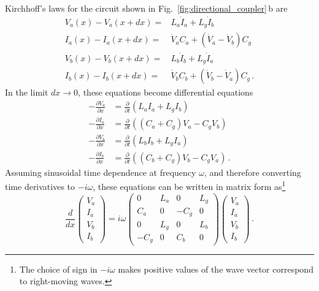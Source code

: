  \label{appendix:coupled_lines}

Kirchhoff's laws for the circuit shown in Fig.~\ref{fig:directional_coupler}\,b are
\begin{align*}
  V_a(x) - V_a(x + dx) =& L_a \dot I_a + L_g \dot I_b \\
  I_a(x) - I_a(x + dx) =& \dot V_a C_a + \left( \dot V_a - \dot V_b \right) C_g \\
  V_b(x) - V_b(x + dx) =& L_b \dot I_b + L_g \dot I_a \\
  I_b(x) - I_b(x + dx) =& \dot V_b C_b + \left( \dot V_b - \dot V_a \right) C_g
  \, .
\end{align*}
In the limit $dx \rightarrow 0$, these equations become differential equations
\begin{align}
  - \frac{\partial V_a}{\partial x} &= \frac{\partial}{\partial t}
    \left( L_a I_a + L_g I_b \right) \nonumber \\
  - \frac{\partial I_a}{\partial x} &= \frac{\partial}{\partial t}
    \left( (C_a + C_g)V_a - C_g V_b \right) \nonumber \\
  - \frac{\partial V_b}{\partial x} &= \frac{\partial}{\partial t}
    \left( L_b I_b + L_g I_a \right) \nonumber \\
  - \frac{\partial I_b}{\partial x} &= \frac{\partial}{\partial t}
    \left( (C_b + C_g)V_b - C_g V_a \right)
  \, .
\end{align}
Assuming sinusoidal time dependence at frequency $\omega$, and therefore converting time derivatives to $-i \omega$, these equations can be written in matrix form as\footnote{The choice of sign in $-i \omega$ makes positive values of the wave vector correspond to right-moving waves.}
\begin{equation}
  \frac{d}{dx} \left(
    \begin{array}{c} V_a \\ I_a \\ V_b \\ I_b \end{array}
  \right)
  =
  i \omega \left( \begin{array}{cccc}
    0 & L_a & 0 & L_g \\
    C_a & 0 & -C_g & 0 \\
    0 & L_g & 0 & L_b \\
    -C_g & 0 & C_b & 0
  \end{array} \right)
  \left(
    \begin{array}{c} V_a \\ I_a \\ V_b \\ I_b \end{array}
  \right) \, .
\end{equation}
